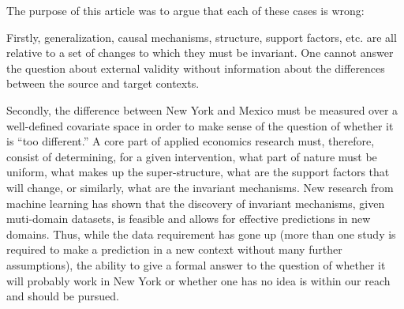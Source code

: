 \documentclass[a4paper,12pt]{article}
\begin{document}
The purpose of this article was to argue that each of these cases is wrong: 

Firstly, generalization, causal mechanisms, structure, support factors, etc. are all relative to a set of changes to which they must be invariant. One cannot answer the question about external validity without information about the differences between the source and target contexts. 

Secondly, the difference between New York and Mexico must be measured over a well-defined covariate space in order to make sense of the question of whether it is ``too different.'' A core part of applied economics research must, therefore, consist of determining, for a given intervention, what part of nature must be uniform, what makes up the super-structure, what are the support factors that will change, or similarly, what are the invariant mechanisms. New research from machine learning has shown that the discovery of invariant mechanisms, given muti-domain datasets, is feasible and allows for effective predictions in new domains. Thus, while the data requirement has gone up (more than one study is required to make a prediction in a new context without many further assumptions), the ability to give a formal answer to the question of whether it will probably work in New York or whether one has no idea is within our reach and should be pursued. 












\end{document}
